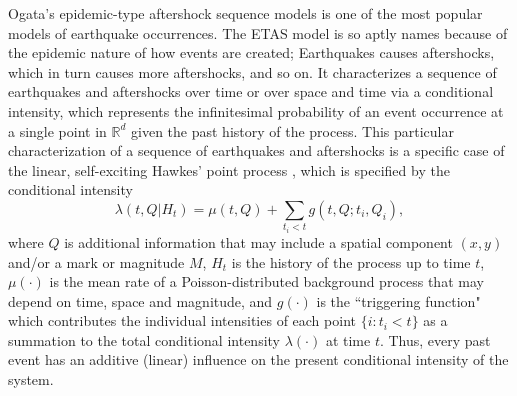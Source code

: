 \documentclass[11pt]{article}\usepackage[]{graphicx}\usepackage[]{color}
\providecommand{\real}[1]{\mathbb{#1}}
\begin{document}
{Ogata's epidemic-type aftershock sequence models \citep{Ogata88,Ogata98} is one of the most popular models of earthquake occurrences. The ETAS model is so aptly names because of the epidemic nature of how events are created; Earthquakes causes aftershocks, which in turn causes more aftershocks, and so on. It characterizes a sequence of earthquakes and aftershocks over time or over space and time via a conditional intensity, which represents the infinitesimal probability of an event occurrence at a single point in $\real{R}^d$ given the past history of the process. This particular characterization of a sequence of earthquakes and aftershocks is a specific case of the linear, self-exciting Hawkes' point process \citep{Hawkes71}, which is specified by the conditional intensity
\begin{equation}\label{hawkes}
\lambda(t, Q | H_t) = \mu(t,Q) + \sum_{t_i < t} g(t,Q; t_i, Q_i),
\end{equation}
where $Q$ is additional information that may include a spatial component $(x,y)$ and/or a mark or magnitude $M$, $H_t$ is the history of the process up to time $t$, $\mu(\cdot)$ is the mean rate of a Poisson-distributed background process that may depend on time, space and magnitude, and $g(\cdot)$ is the ``triggering function" which contributes the individual intensities of each point $\{i: t_i < t\}$ as a summation to the total conditional intensity $\lambda(\cdot)$ at time $t$. Thus, every past event has an additive (linear) influence on the present conditional intensity of the system.

}
\end{document}

